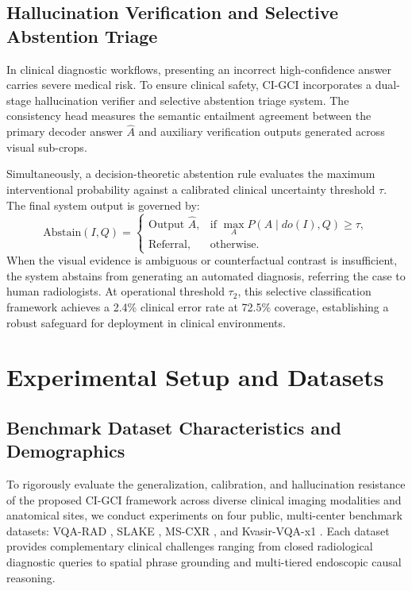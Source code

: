 \documentclass[journal,twoside,web]{ieeecolor}
\begin{document}
\subsection{Hallucination Verification and Selective Abstention Triage}
In clinical diagnostic workflows, presenting an incorrect high-confidence answer carries severe medical risk. To ensure clinical safety, CI-GCI incorporates a dual-stage hallucination verifier and selective abstention triage system. The consistency head measures the semantic entailment agreement between the primary decoder answer $\hat{A}$ and auxiliary verification outputs generated across visual sub-crops.

Simultaneously, a decision-theoretic abstention rule evaluates the maximum interventional probability against a calibrated clinical uncertainty threshold $\tau$. The final system output is governed by:
\begin{equation}
\text{Abstain}(I, Q) = \begin{cases} 
\text{Output } \hat{A}, & \text{if } \max\limits_{A} P(A \mid do(I), Q) \ge \tau, \\[3pt]
\text{Referral}, & \text{otherwise.}
\end{cases}
\label{eq:abstain}
\end{equation}
When the visual evidence is ambiguous or counterfactual contrast is insufficient, the system abstains from generating an automated diagnosis, referring the case to human radiologists. At operational threshold $\tau_2$, this selective classification framework achieves a 2.4\% clinical error rate at 72.5\% coverage, establishing a robust safeguard for deployment in clinical environments.

\section{Experimental Setup and Datasets}
\label{sec:datasets}

\subsection{Benchmark Dataset Characteristics and Demographics}
To rigorously evaluate the generalization, calibration, and hallucination resistance of the proposed CI-GCI framework across diverse clinical imaging modalities and anatomical sites, we conduct experiments on four public, multi-center benchmark datasets: VQA-RAD \cite{lau2018}, SLAKE \cite{liu2021}, MS-CXR \cite{boecking2022}, and Kvasir-VQA-x1 \cite{jha2023}. Each dataset provides complementary clinical challenges ranging from closed radiological diagnostic queries to spatial phrase grounding and multi-tiered endoscopic causal reasoning.
\end{document}
